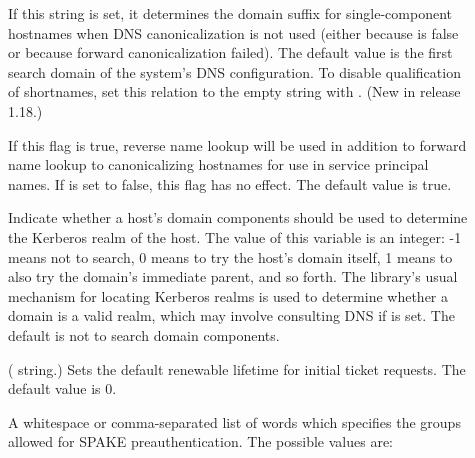 \documentclass[letterpaper,10pt,english]{sphinxmanual}
\begin{document}
\begin{description}
\item[{}] \leavevmode
If this string is set, it determines the domain suffix for
single-component hostnames when DNS canonicalization is not used
(either because  is false or because
forward canonicalization failed).  The default value is the first
search domain of the system’s DNS configuration.  To disable
qualification of shortnames, set this relation to the empty string
with .  (New in release 1.18.)

\item[{}] \leavevmode
If this flag is true, reverse name lookup will be used in addition
to forward name lookup to canonicalizing hostnames for use in
service principal names.  If  is set
to false, this flag has no effect.  The default value is true.

\item[{}] \leavevmode
Indicate whether a host’s domain components should be used to
determine the Kerberos realm of the host.  The value of this
variable is an integer: -1 means not to search, 0 means to try the
host’s domain itself, 1 means to also try the domain’s immediate
parent, and so forth.  The library’s usual mechanism for locating
Kerberos realms is used to determine whether a domain is a valid
realm, which may involve consulting DNS if  is
set.  The default is not to search domain components.

\item[{}] \leavevmode
( string.)  Sets the default renewable lifetime
for initial ticket requests.  The default value is 0.

\item[{}] \leavevmode
A whitespace or comma-separated list of words which specifies the
groups allowed for SPAKE preauthentication.  The possible values
are:


\begin{savenotes}\sphinxattablestart
\centering
\begin{tabulary}{\linewidth}[t]{|T|T|}
\hline


\end{tabulary}
\end{savenotes}
\end{description}
\end{document}
